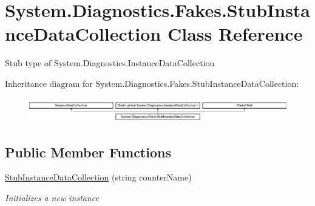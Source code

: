 \hypertarget{class_system_1_1_diagnostics_1_1_fakes_1_1_stub_instance_data_collection}{\section{System.\-Diagnostics.\-Fakes.\-Stub\-Instance\-Data\-Collection Class Reference}
\label{class_system_1_1_diagnostics_1_1_fakes_1_1_stub_instance_data_collection}
}


Stub type of System.\-Diagnostics.\-Instance\-Data\-Collection 


Inheritance diagram for System.\-Diagnostics.\-Fakes.\-Stub\-Instance\-Data\-Collection\-:\begin{figure}[H]
\begin{center}
\leavevmode
\includegraphics[height=1.060606cm]{class_system_1_1_diagnostics_1_1_fakes_1_1_stub_instance_data_collection}
\end{center}
\end{figure}
\subsection*{Public Member Functions}
\begin{DoxyCompactItemize}
\item 
\hyperlink{class_system_1_1_diagnostics_1_1_fakes_1_1_stub_instance_data_collection_abe6ac6827d71b340b0d9c418d0ae6ee4}{Stub\-Instance\-Data\-Collection} (string counter\-Name)
\begin{DoxyCompactList}\small\item\em Initializes a new instance\end{DoxyCompactList}\end{DoxyCompactItemize}

